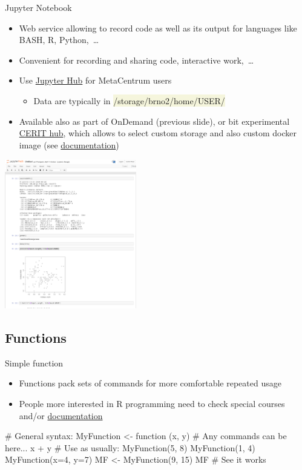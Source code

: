 \documentclass[compress, xelatex, 11pt, xcolor=svgnames, aspectratio=169,
	hyperref={
		bookmarks=true,
		unicode=true,
		colorlinks=true,
		pdftitle={Molecular data in R},
		plainpages=false,
		pdfauthor={Vojtech Zeisek},
		pdfsubject={Course about phylogeny and evolution in R},
		pdfcreator={XeLaTeX},
		pdfkeywords={R, evolution, phylogeny, molecular data},
		linkcolor=Crimson, %
		anchorcolor=Magenta, %
		citecolor=Magenta, %
		filecolor=Magenta, %
		menucolor=Magenta, %
		urlcolor=DodgerBlue, %
		},
	url={hyphens, lowtilde} %
	]{beamer}
\renewcommand{\texttt}[1]{\colorbox{Beige}{{\ttfamily #1}}}
\begin{document}
\begin{frame}{Jupyter Notebook}
	\begin{multicols}{2}
		\begin{itemize}
			\item Web service allowing to record code as well as its output for languages like BASH, R, Python,~\ldots
			\item Convenient for recording and sharing code, interactive work,~\ldots
			\item Use \href{https://docs.metacentrum.cz/related/jupyter/}{Jupyter Hub} for MetaCentrum users
			\begin{itemize}
				\item Data are typically in \texttt{/storage/brno2/home/USER/}
			\end{itemize}
			\item Available also as part of OnDemand (previous slide), or bit experimental \href{https://hub.cloud.e-infra.cz/}{CERIT hub}, which allows to select custom storage and also custom docker image (see \href{https://docs.cerit.io/docs/jupyterhub.html}{documentation})
		\end{itemize}
		\begin{center}
			\includegraphics[height=6.5cm]{jupyter.png}
		\end{center}
	\end{multicols}
\end{frame}

\subsection{Functions}

\begin{frame}[fragile]{Simple function}
	\begin{itemize}
		\item Functions pack sets of commands for more comfortable repeated usage
		\item People more interested in R programming need to check special courses and/or \href{https://CRAN.R-project.org/manuals.html}{documentation}
	\end{itemize}
	\begin{spluscode}
    # General syntax:
    MyFunction <- function (x, y) {
      # Any commands can be here...
      x + y
      }
    # Use as usually:
    MyFunction(5, 8)
    MyFunction(1, 4)
    MyFunction(x=4, y=7)
    MF <- MyFunction(9, 15)
    MF # See it works
	\end{spluscode}
\end{frame}
\end{document}
